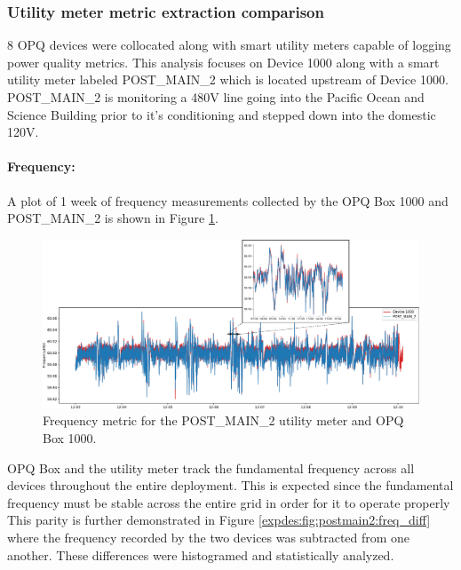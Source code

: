 \subsubsection{Utility meter metric extraction comparison}

8 OPQ devices were collocated along with smart utility meters capable of logging power quality metrics.
This analysis focuses on Device 1000 along with a smart utility meter labeled POST\_MAIN\_2 which is located upstream of Device 1000.
POST\_MAIN\_2 is monitoring a 480V line going into the Pacific Ocean and Science Building prior to it's conditioning and stepped down into the domestic 120V.

\paragraph{Frequency:}
A plot of 1 week of frequency measurements collected by the OPQ Box 1000 and POST\_MAIN\_2 is shown in Figure \ref{expdes:fig:postmain2:freq}.

\begin{figure}[ht!]
    \centering
    \includegraphics[width=1\linewidth]{img/napali_eval/gt/gt_frequency.pdf}
    \caption{Frequency metric for the POST\_MAIN\_2 utility meter and OPQ Box 1000.}
    \label{expdes:fig:postmain2:freq}
\end{figure}

OPQ Box and the utility meter track the fundamental frequency across all devices throughout the entire deployment.
This is expected since the fundamental frequency must be stable across the entire grid in order for it to operate properly
This parity is further demonstrated in Figure \ref{expdes:fig:postmain2:freq_diff} where the frequency recorded by the two devices was subtracted from one another.
These differences were histogramed and statistically analyzed.

